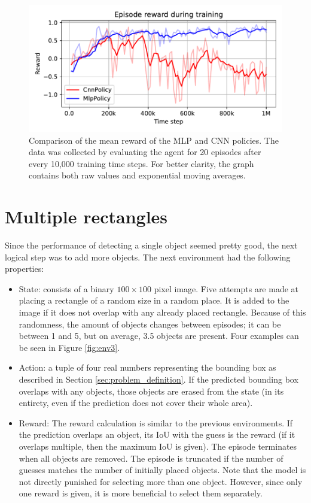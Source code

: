 \documentclass[
  digital,     %
  oneside,     %
  nosansbold,  %
  nocolorbold, %
  lof,         %
  lot,         %
]{fithesis4}
\begin{document}
\begin{figure}
    \includegraphics[width=1\linewidth]{graphs/v2_mpl_cnn.pdf}
    \caption{Comparison of the mean reward of the MLP and CNN policies. The data was collected by evaluating the agent for 20 episodes after every 10,000 training time steps. For better clarity, the graph contains both raw values and exponential moving averages.}
    \label{fig:v2_mlp_cnn}
\end{figure}

\section{Multiple rectangles}
\label{sec:multi-rect}
Since the performance of detecting a single object seemed pretty good, the next logical step was to add more objects. The next environment had the following properties:
\begin{itemize}
    \item State: consists of a binary $100\times100$ pixel image. Five attempts are made at placing a rectangle of a random size in a random place. It is added to the image if it does not overlap with any already placed rectangle. Because of this randomness, the amount of objects changes between episodes; it can be between 1 and 5, but on average, 3.5 objects are present. Four examples can be seen in Figure \ref{fig:env3}.
    \item Action: a tuple of four real numbers representing the bounding box as described in Section \ref{sec:problem_definition}. If the predicted bounding box overlaps with any objects, those objects are erased from the state (in its entirety, even if the prediction does not cover their whole area).
    \item Reward: The reward calculation is similar to the previous environments. If the prediction overlaps an object, its IoU with the guess is the reward (if it overlaps multiple, then the maximum IoU is given). The episode terminates when all objects are removed. The episode is truncated if the number of guesses matches the number of initially placed objects. Note that the model is not directly punished for selecting more than one object. However, since only one reward is given, it is more beneficial to select them separately.
\end{itemize}
\end{document}
